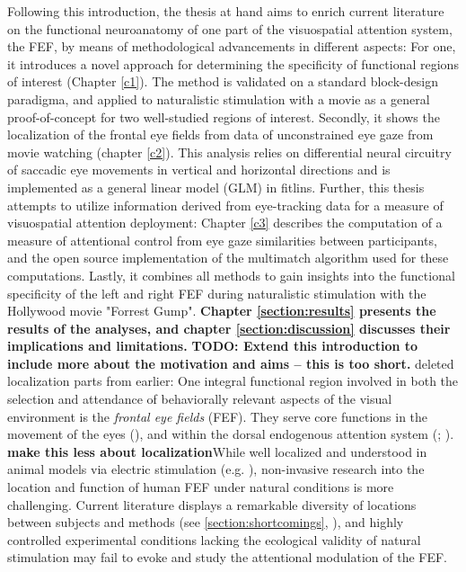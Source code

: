 \documentclass[a4paper, 12pt]{scrreprt}
\begin{document}
Following this introduction, the thesis at hand aims to enrich current literature on the functional neuroanatomy of one part of the visuospatial attention system, the FEF, by means of methodological advancements in different aspects: For one, it introduces a novel approach for determining the specificity of functional regions of interest (Chapter \ref{c1}). The method is validated on a standard block-design paradigma, and applied to naturalistic stimulation with a movie as a general proof-of-concept for two well-studied regions of interest.
Secondly, it shows  the localization of the frontal eye fields from data of unconstrained eye gaze from movie watching (chapter \ref{c2}). This analysis relies on differential neural circuitry of saccadic eye movements in vertical and horizontal directions and is implemented as a general linear model (GLM) in fitlins. Further, this thesis attempts to utilize information derived from eye-tracking data for a measure of visuospatial attention deployment: Chapter \ref{c3} describes the computation of a measure of attentional control from eye gaze similarities between participants, and the open source implementation of the multimatch algorithm used for these computations. Lastly, it combines all methods to gain insights into the functional specificity of the left and right FEF during naturalistic stimulation with the Hollywood movie "Forrest Gump". \textbf{Chapter \ref{section:results} presents the results of the analyses, and chapter \ref{section:discussion} discusses their implications and limitations.} \newline
\textbf{TODO: Extend this introduction to include more about the motivation and aims -- this is too short.}
{\tiny
deleted localization parts from earlier: One integral functional region involved in both the selection and attendance of behaviorally relevant aspects of the visual environment is the \textit{frontal eye fields} (FEF). They serve core functions in the movement of the eyes (\cite{krauzlis2014eye}), and within the dorsal endogenous attention system (\cite{corbetta2002control}; \cite{corbetta2008reorienting}). \textbf{make this less about localization}While well localized and understood in animal models via electric stimulation (e.g. \cite{bruce1985primate}), non-invasive research into the location and function of human FEF under natural conditions is more challenging. Current literature displays a remarkable diversity of locations between subjects and methods (see \ref{section:shortcomings}, \cite{vernet2014corrigendum}), and highly controlled experimental conditions lacking the ecological validity of natural stimulation may fail to evoke and study the attentional modulation of the FEF.}
\end{document}
